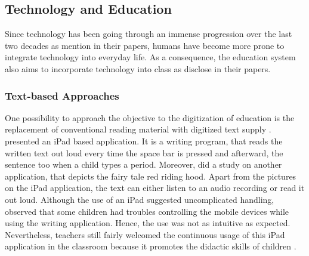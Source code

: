 \subsection{Technology and Education}
\label{subsection:TechnologyEducation}
Since technology has been going through an immense progression over the last two decades as \textcite{walker2000screen, liu2005reading} mention in their papers, humans have become more prone to integrate technology into everyday life. As a consequence, the education system also aims to incorporate technology into class as \textcite{walker2000screen, engen2014ipads, gan2015enhancing, lozano2016dedigitalizing, nouri2016teaching} disclose in their papers. \\
\subsubsection{Text-based Approaches}
One possibility to approach the objective to the digitization of education is the replacement of conventional reading material with digitized text supply \autocite{walker2000screen, liu2005reading, engen2014ipads}. 
\textcite{engen2014ipads} presented an iPad based application. It is a writing program, that reads the written text out loud every time the space bar is pressed and afterward, the sentence too when a child types a period. Moreover, \textcite{engen2014ipads} did a study on another application, that depicts the fairy tale red riding hood. Apart from the pictures on the iPad application, the text can either listen to an audio recording or read it out loud. Although the use of an iPad suggested uncomplicated handling, \textcite{engen2014ipads} observed that some children had troubles controlling the mobile devices while using the writing application. Hence, the use was not as intuitive as expected. 
Nevertheless, teachers still fairly welcomed the continuous usage of this iPad application in the classroom because it promotes the didactic skills of children \autocite{engen2014ipads}. 

